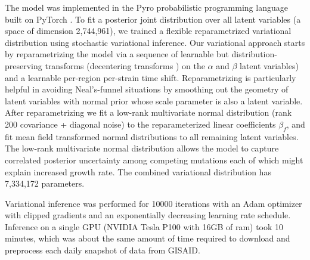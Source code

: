 \documentclass[12pt]{article}
\begin{document}
The model was implemented in the Pyro probabilistic programming language \cite{bingham2019pyro} built on PyTorch \cite{paszke2017automatic}.
To fit a posterior joint distribution over all latent variables (a space of dimension 2,744,961), we trained a flexible reparametrized variational distribution using stochastic variational inference.
Our variational approach starts by reparametrizing the model via a sequence of learnable but distribution-preserving transforms (decentering transforms \cite{gorinova2020automatic}) on the $\alpha$ and $\beta$ latent variables) and a learnable per-region per-strain time shift.
Reparametrizing is particularly helpful in avoiding Neal's-funnel situations by smoothing out the geometry of latent variables with normal prior whose scale parameter is also a latent variable.
After reparametrizing we fit a low-rank multivariate normal distribution (rank 200 covariance + diagonal noise) to the reparameterized linear coefficients $\beta_f$, and fit mean field transformed normal distributions to all remaining latent variables.
The low-rank multivariate normal distribution allows the model to capture correlated posterior uncertainty among competing mutations each of which might explain increased growth rate.
The combined variational distribution has 7,334,172 parameters.

Variational inference was performed for 10000 iterations with an Adam optimizer with clipped gradients and an exponentially decreasing learning rate schedule.
Inference on a single GPU (NVIDIA Tesla P100 with 16GB of ram) took 10 minutes, which was about the same amount of time required to download and preprocess each daily snapshot of data from GISAID.




\end{document}
